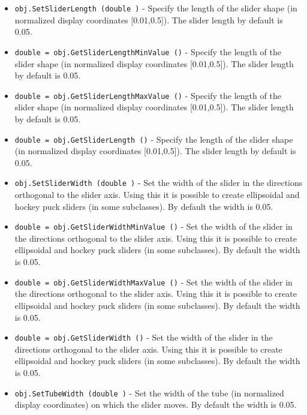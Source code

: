 \begin{itemize}
\item  \verb|obj.SetSliderLength (double )| -  Specify the length of the slider shape (in normalized display coordinates
 [0.01,0.5]). The slider length by default is 0.05.

\item  \verb|double = obj.GetSliderLengthMinValue ()| -  Specify the length of the slider shape (in normalized display coordinates
 [0.01,0.5]). The slider length by default is 0.05.

\item  \verb|double = obj.GetSliderLengthMaxValue ()| -  Specify the length of the slider shape (in normalized display coordinates
 [0.01,0.5]). The slider length by default is 0.05.

\item  \verb|double = obj.GetSliderLength ()| -  Specify the length of the slider shape (in normalized display coordinates
 [0.01,0.5]). The slider length by default is 0.05.

\item  \verb|obj.SetSliderWidth (double )| -  Set the width of the slider in the directions orthogonal to the
 slider axis. Using this it is possible to create ellipsoidal and hockey
 puck sliders (in some subclasses). By default the width is 0.05.

\item  \verb|double = obj.GetSliderWidthMinValue ()| -  Set the width of the slider in the directions orthogonal to the
 slider axis. Using this it is possible to create ellipsoidal and hockey
 puck sliders (in some subclasses). By default the width is 0.05.

\item  \verb|double = obj.GetSliderWidthMaxValue ()| -  Set the width of the slider in the directions orthogonal to the
 slider axis. Using this it is possible to create ellipsoidal and hockey
 puck sliders (in some subclasses). By default the width is 0.05.

\item  \verb|double = obj.GetSliderWidth ()| -  Set the width of the slider in the directions orthogonal to the
 slider axis. Using this it is possible to create ellipsoidal and hockey
 puck sliders (in some subclasses). By default the width is 0.05.

\item  \verb|obj.SetTubeWidth (double )| -  Set the width of the tube (in normalized display coordinates) on which
 the slider moves. By default the width is 0.05.


\end{itemize}
